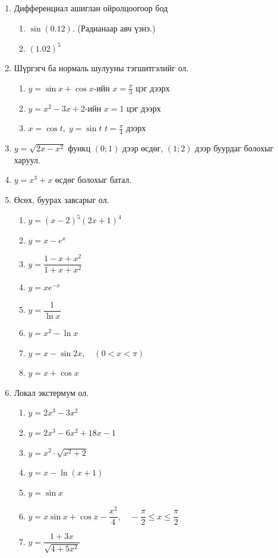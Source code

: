 \begin{enumerate}
  \item Дифференциал ашиглан ойролцоогоор бод
  \begin{enumerate}
  \item  \(\sin(0.12)\). (Радианаар авч үзнэ.)
  \item \((1.02)^5\)
\end{enumerate}
  \item Шүргэгч ба нормаль шулууны тэгшитгэлийг ол.    
  \begin{enumerate}
      \item \(y=\sin x+\cos x\)-ийн \(x=\tfrac{\pi}{3}\) цэг дээрх 
  \item \(y=x^2-3x+2\)-ийн \(x=1\) цэг дээрх 
  \item  \(x=\cos t,\; y=\sin t\) \(t=\tfrac{\pi}{4}\) дээрх
  \end{enumerate}
    \item $y=\sqrt{2x-x^2}$ функц $(0;1)$  дээр өсдөг, $(1;2)$ дээр буурдаг болохыг харуул.
    \item $y=x^3+x$ өсдөг болохыг батал.
    \item Өсөх, буурах завсарыг ол.
    \begin{enumerate}
        \item $y=(x-2)^5(2x+1)^4$
        \item $y=x-e^x$
        \item $y=\dfrac{1-x+x^2}{1+x+x^2}$
        \item $y=xe^{-x}$
        \item $y=\dfrac{1}{\ln x}$
        \item $y=x^2-\ln x$
        \item $y=x-\sin 2x,\quad (0<x<\pi)$
        \item $y=x+\cos x$
    \end{enumerate}
    \item Локал экстермум ол.
    \begin{enumerate}
        \item $y=2x^3-3x^2$
        \item $y=2x^3-6x^2+18x-1$
        \item $y=x^2\cdot \sqrt{x^2+2}$
        \item $y=x-\ln (x+1)$
        \item $y=\sin x$
        \item $y=x\sin x+\cos x-\dfrac{x^2}{4}, \quad -\dfrac{\pi}{2}\leq x\leq \dfrac{\pi}{2}$
        \item $y=\dfrac{1+3x}{\sqrt{4+5x^2}}$

\end{enumerate}
\end{enumerate}
